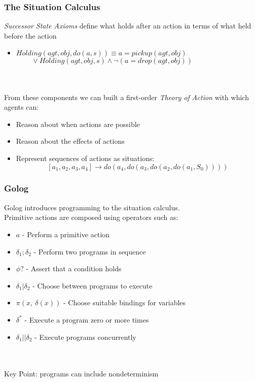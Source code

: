 \documentclass{beamer}
\begin{document}
\begin{frame}
\frametitle{The Situation Calculus}
\emph{Successor State Axioms} define what holds after an action in terms of what held before the action
\begin{itemize}
  \item $Holding(agt,obj,do(a,s)) \equiv a = pickup(agt,obj)$ \\
        $\,\,\,\,\,\,\,\,\,\,\,\,\,\vee Holding(agt,obj,s) \wedge \neg\left(a = drop(agt,obj)\right)$
\end{itemize}
\ \\
\ \\
\pause
From these components we can built a first-order \emph{Theory of Action}
with which agents can:
\begin{itemize}
  \item Reason about when actions are possible
  \item Reason about the effects of actions
  \item Represent sequences of actions as situations:\[
\left[a_1, a_2, a_3, a_4\right] \rightarrow do(a_4,do(a_3,do(a_2,do(a_1,S_0))))
\]
\end{itemize}
\end{frame}

\begin{frame}
\frametitle{Golog}
Golog introduces programming to the situation calculus.\\
Primitive actions are composed using operators such as:

\begin{itemize}
  \item $a$ - Perform a primitive action
  \item $\delta_1;\delta_2$ - Perform two programs in sequence
  \item $\phi?$ - Assert that a condition holds
  \item $\delta_1|\delta_2$ - Choose between programs to execute
  \item $\pi(x,\ \delta(x))$ - Choose suitable bindings for variables
  \item $\delta^*$ - Execute a program zero or more times
  \item $\delta_1 || \delta_2$ - Execute programs concurrently
\end{itemize}
\ \\
\ \\
\pause
Key Point:  programs can include \alert{nondeterminism}
\end{frame}
\end{document}
